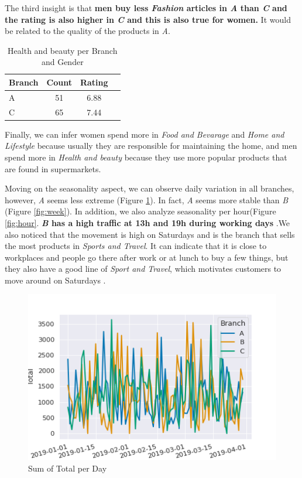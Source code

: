 \documentclass[11pt, a4]{article}
\begin{document}
The third insight is that \textbf{men buy less \textit{Fashion} articles in \textit{A} than \textit{C} and the rating is also higher in \textit{C} and this is also true for women.} It would be related to the quality of the products in \textit{A}.

\begin{table}[h!]
\centering
\begin{tabular}{l c c c}
\toprule
\textbf{Branch} & \textbf{Count} & \textbf{Rating} \\
\midrule
A& 	51 	&6.88\\
C &	65 	&7.44\\
\bottomrule
\end{tabular}
\caption{Health and beauty per Branch and Gender}
\label{table:4}
\end{table}

Finally, we can infer women spend more in \textit{Food and Bevarage} and \textit{Home and Lifestyle} because usually they are responsible for maintaining the home, and men spend more in \textit{Health and beauty} because they use more popular products that are found in supermarkets.

Moving on the seasonality aspect, we can observe daily variation in all branches, however, \textit{A} seems less extreme (Figure \ref{fig:season}). In fact, \textit{A} seems more stable than \textit{B} (Figure \ref{fig:week}). In addition, we also analyze seasonality per hour(Figure \ref{fig:hour}. \textbf{\textit{B} has a high traffic at 13h and 19h during working days} .We also noticed that the movement is high on Saturdays and is the branch that sells the most products in \textit{Sports and Travel}. It can indicate that it is close to workplaces and people go there after work or at lunch to buy a few things, but they also have a good line of \textit{Sport and Travel}, which motivates customers to move around on Saturdays .

\begin{figure}[!h]
\includegraphics[scale=0.8]{season}
\centering
\caption{Sum of Total per Day}
\label{fig:season}
\end{figure}
\end{document}
